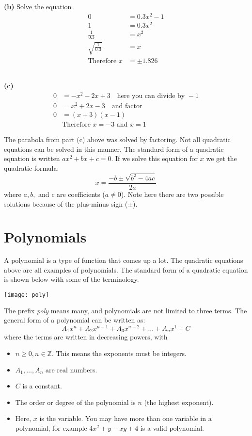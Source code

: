 \begin{multicols}{2}
\textbf{(b)} Solve the equation 
\begin{align*}
0&=0.3x^2-1\\
1&=0.3x^2\\
\frac{1}{0.3}&=x^2\\
\sqrt{\frac{1}{0.3}}&=x\\
\textrm{Therefore }x&=\pm 1.826
\end{align*}\\
\columnbreak

\textbf{(c)}
\begin{align*}
0&=-x^2-2x+3\quad\textrm{here you can divide by }-1\\
0&=x^2+2x-3\quad\textrm{and factor}\\
0&=(x+3)(x-1)\\
&\textrm{Therefore }x=-3\textrm{ and }x=1
 \end{align*}
\end{multicols}
The parabola from part (c) above was solved by factoring. Not all quadratic equations can be solved in this manner. The standard form of a quadratic equation is written $a x^{2} +b x +c =0$. If we solve this equation for $x$ we get the quadratic formula:
 $$x =\frac{ -b \pm \sqrt{b^{2} -4 a c}}{2 a}$$ 
 where $a,b,$ and $c$ are coefficients ($a\ne0$). Note here there are two possible solutions because of the plus-minus sign ($\pm$).
\section{Polynomials}
 A polynomial is a type of function that comes up a lot. The quadratic equations above are all examples of polynomials. The standard form of a quadratic equation is shown below with some of the terminology.
 \begin{center}
 \texttt{[image: poly]}
\end{center}
The prefix \textit{poly} means many, and polynomials are not limited to three terms. The general form of a polynomial can be written as:
$$ A_1x^n+A_2x^{n-1}+A_3x^{n-2}+\dots+A_nx^1+C $$
where the terms are written in decreasing powers, with
\vspace{-0.5cm}\begin{itemize}
	\setlength\itemsep{0em}
	\item $n\ge 0, n\in \mathbb{Z}$. This means the exponents must be integers.
	\item $A_1, \dots, A_n$ are real numbers.
	\item $C$ is a constant.
	\item The order or degree of the polynomial is $n$ (the highest exponent).
	\item Here, $x$ is the variable. You may have more than one variable in a polynomial, for example $4x^2+y-xy+4$ is a valid polynomial.
\end{itemize}


